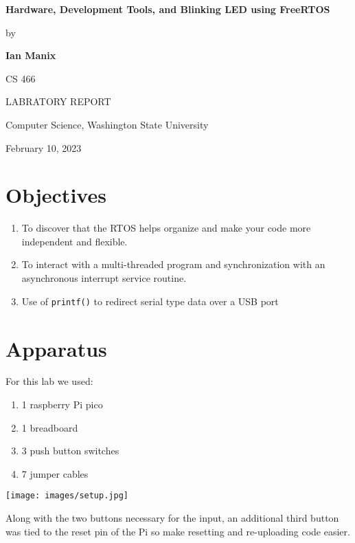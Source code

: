\documentclass[sigconf]{article}
\begin{document}
\begin{center}
   \textbf{Hardware, Development Tools, and Blinking LED using FreeRTOS}

   \vspace{.75in}

   by

   \textbf{Ian Manix}

   \vspace{2in}

   CS 466

   LABRATORY REPORT

   \vspace{.75in}

   Computer Science, Washington State University

   February 10, 2023

\end{center}

\clearpage
\section*{Objectives}

\begin{enumerate}
    \item To discover that the RTOS helps organize and make your code more independent and flexible. 
    \item To interact with a multi-threaded program and synchronization with an asynchronous interrupt service
routine. 
    \item Use of \lstinline{printf()} to redirect serial type data over a USB port
\end{enumerate}


\section*{Apparatus}

For this lab we used:
\begin{enumerate}
  \item 1 raspberry Pi pico 
  \item 1 breadboard
  \item 3 push button switches
  \item 7 jumper cables
\end{enumerate}

\texttt{[image: images/setup.jpg]}

Along with the two buttons necessary for the input, an additional third button was tied to the reset pin of the Pi so make resetting and re-uploading code easier.
\end{document}
